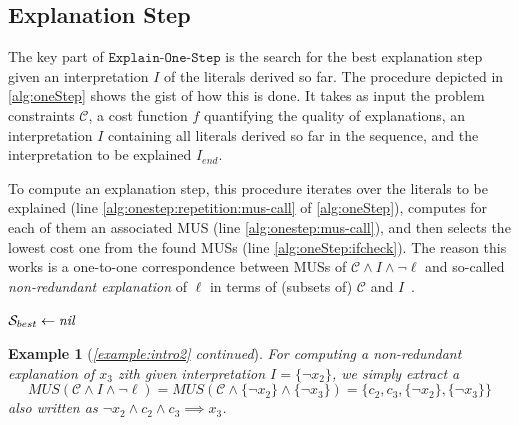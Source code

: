 \documentclass[twoside,11pt]{article}
\newcommand\m[1]{\mathcal{#1}}
\newtheorem{example}{Example}
\newcommand\comment[1]{\marginpar{\tiny #1}}
\renewcommand\comment[1]{#1}
\newcommand{\emilio}[1]{{\comment{\color{red}Emilio: #1}}}
\newcommand\Iend{\ensuremath{I_\mathit{end} }\xspace}
\newcommand\formulac{\ensuremath{\m{C} }\xspace}
\newcommand\mm[1]{\ensuremath{#1}\xspace}
\newcommand\call[1]{\mm{\texttt{#1}}}
\newcommand\onestep{\ensuremath{\call{Explain-One-Step}}\xspace}
\begin{document}

\subsection{Explanation Step}

The key part of \onestep is the search for the best explanation step given an interpretation $I$ of the literals derived so far.
The procedure depicted in \cref{alg:oneStep} shows the gist of how this is done. 
It takes as input the problem constraints \formulac, a cost function $f$ quantifying the quality of explanations, an interpretation $I$ containing all literals derived so far in the sequence, and the interpretation to be explained $\Iend$. 

To compute an explanation step, this procedure iterates over the literals to be explained (line \ref{alg:onestep:repetition:mus-call} of \cref{alg:oneStep}), computes for each of them an associated MUS (line \ref{alg:onestep:mus-call}), and then selects the lowest cost one from the found MUSs (line \ref{alg:oneStep:ifcheck}).
The reason this works is a one-to-one correspondence between MUSs of $\formulac \land I \land \neg \ell$ and so-called \emph{non-redundant explanation} of $\ell$ in terms of (subsets of) $\formulac$ and $I$~\cite{ecai/BogaertsGCG20}. 


\begin{algorithm}[!h]
	\DontPrintSemicolon
	\caption{$\onestep(\formulac,f,I,\Iend)$}
	\label{alg:oneStep}
	${\cal S}_{best} \gets \mathit{nil}$\;
	\For{$\ell \in \{\Iend \setminus I\}$\label{alg:onestep:repetition:mus-call}}{
		${\cal S} \gets \call{MUS}{(\formulac \land I \land \neg \ell)}$\label{alg:onestep:mus-call}\;
		\If{$f({\cal S})<f({\cal S}_{best})$\label{alg:oneStep:ifcheck}}{
			${\cal S}_{best} \gets {\cal S}$\;
		}
	}
	 \;

\end{algorithm}
\begin{example}[\textit{\cref{example:intro2} continued}]\label{example:intro3}%
	For computing a non-redundant explanation of $x_3$ zith given interpretation $I  = \{\lnot x_2\}$, we simply extract a \[MUS(\formulac \land I \land \neg \ell) = MUS(\formulac \wedge \{\lnot x_2\} \wedge \{\lnot x_3\}) = \{ c_2 , c_3, \{\lnot x_2\}, \{\lnot x_3\} \}\] also written as $\lnot x_2 \wedge c_2 \wedge c_3 \implies x_3$.
\end{example}
\end{document}
